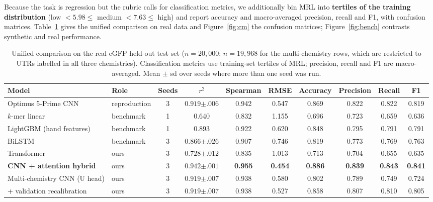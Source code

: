 \documentclass{article}
\begin{document}
Because the task is regression but the rubric calls for classification metrics, we
additionally bin MRL into \textbf{tertiles of the training distribution} (low $<5.98 \le$
medium $<7.63 \le$ high) and report accuracy and macro-averaged precision, recall and F1,
with confusion matrices. Table~\ref{tab:bench} gives the unified comparison on real data and
Figure~\ref{fig:cm} the confusion matrices; Figure~\ref{fig:bench} contrasts synthetic and
real performance.

\begin{table}[t]
\caption{Unified comparison on the real eGFP held-out test set ($n=20{,}000$; $n=19{,}968$
for the multi-chemistry rows, which are restricted to UTRs labelled in all three
chemistries). Classification metrics use training-set tertiles of MRL; precision, recall and
F1 are macro-averaged. Mean $\pm$ sd over seeds where more than one seed was run.}
\label{tab:bench}
\vskip 0.1in
\begin{center}
\begin{small}
\setlength{\tabcolsep}{3.4pt}
\begin{tabular}{llcccccccc}
\toprule
Model & Role & Seeds & $r^2$ & Spearman & RMSE & Accuracy & Precision & Recall & F1 \\
\midrule
Optimus 5-Prime CNN & reproduction & 3 & $0.919${\scriptsize$\pm.006$} & 0.942 & 0.547 & 0.869 & 0.822 & 0.822 & 0.819 \\
$k$-mer linear & benchmark & 1 & 0.640 & 0.832 & 1.155 & 0.696 & 0.723 & 0.659 & 0.636 \\
LightGBM (hand features) & benchmark & 1 & 0.893 & 0.922 & 0.620 & 0.848 & 0.795 & 0.791 & 0.791 \\
BiLSTM & benchmark & 3 & $0.866${\scriptsize$\pm.026$} & 0.907 & 0.746 & 0.819 & 0.773 & 0.769 & 0.763 \\
\midrule
Transformer & ours & 3 & $0.728${\scriptsize$\pm.012$} & 0.835 & 1.013 & 0.713 & 0.704 & 0.655 & 0.635 \\
\textbf{CNN + attention hybrid} & ours & 3 & $\mathbf{0.942}${\scriptsize$\pm.001$} & \textbf{0.955} & \textbf{0.454} & \textbf{0.886} & \textbf{0.839} & \textbf{0.843} & \textbf{0.841} \\
Multi-chemistry CNN (U head) & ours & 3 & $0.919${\scriptsize$\pm.007$} & 0.938 & 0.580 & 0.802 & 0.789 & 0.749 & 0.724 \\
\quad + validation recalibration & ours & 3 & $0.919${\scriptsize$\pm.007$} & 0.938 & 0.527 & 0.858 & 0.807 & 0.810 & 0.805 \\
\bottomrule
\end{tabular}
\end{small}
\end{center}
\vskip -0.1in
\end{table}
\end{document}
